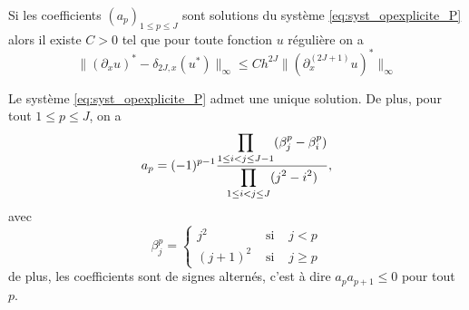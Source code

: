 \begin{corollaire}
Si les coefficients $(a_p)_{1 \leq p \leq J}$ sont solutions du système \eqref{eq:syst_opexplicite_P} alors il existe $C>0$ tel que pour toute fonction $u$ régulière on a 
\begin{equation}
\| (\partial_x u)^* - \delta_{2J,x}(u^*) \|_{\infty} \leq C h^{2J} \| (\partial^{(2J+1)}_x u)^* \|_{\infty}
\end{equation} 
\end{corollaire}

\begin{proposition}
Le système \eqref{eq:syst_opexplicite_P} admet une unique solution. De plus, pour tout $1 \leq p \leq J$, on a
\begin{equation}
a_p = (-1)^{p-1} \dfrac{\displaystyle\prod\limits_{1 \leq i <j \leq J-1}(\beta_j^p - \beta_i^p)}{\displaystyle\prod\limits_{1 \leq i <j \leq J}(j^2 - i^2)},
\end{equation}
avec 
\begin{equation}
\beta^p_j = \left\lbrace
\begin{array}{rcl}
j^2 & \text{ si } & j<p \\
(j+1)^2 & \text{ si } & j \geq p
\end{array}
\right.
\end{equation}
de plus, les coefficients sont de signes alternés, c'est à dire $a_p a_{p+1} \leq 0$ pour tout $p$.
\end{proposition}

